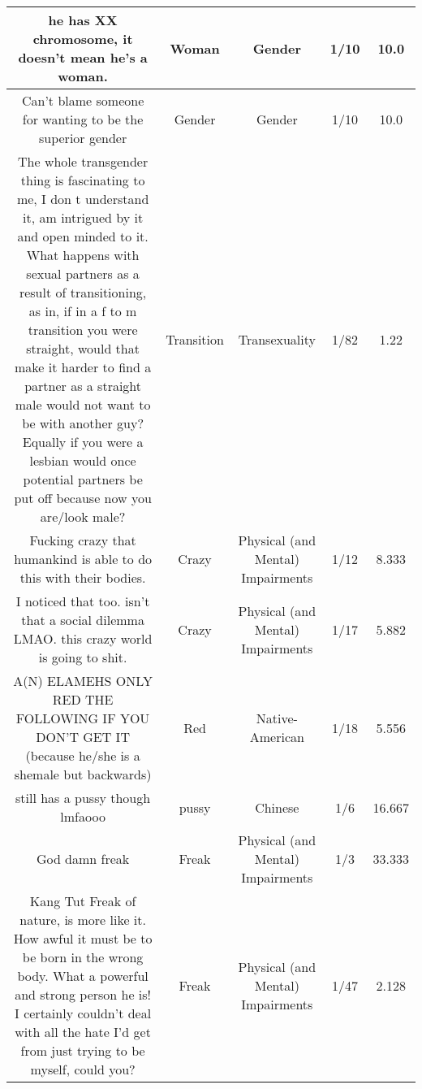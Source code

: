 \documentclass[11pt]{article}
\newlength\mylength
\begin{document}
\begin{center}
\begin{longtable}{|C{.40\mylength}|C{.30\mylength}|C{.15\mylength}|C{.15\mylength}|C{.15\mylength}|}
  he has XX chromosome, it doesn't mean he's a woman.  & Woman & Gender & 1/10 & 10.0 \\  \hline
  Can't blame someone for wanting to be the superior gender  & Gender & Gender & 1/10 & 10.0 \\  \hline
  The whole transgender thing is fascinating to me, I don t understand it, am intrigued by it and open minded to it. What happens with sexual partners as a result of transitioning, as in, if in a f to m transition you were straight, would that make it harder to find a partner as a straight male would not want to be with another guy? Equally if you were a lesbian would once potential partners be put off because now you are/look male?  & Transition & Transexuality & 1/82 & 1.22 \\  \hline
  Fucking crazy that humankind is able to do this with their bodies.  & Crazy & Physical (and Mental) Impairments & 1/12 & 8.333 \\  \hline
  I noticed that too. isn't that a social dilemma LMAO. this crazy world is going to shit.  & Crazy & Physical (and Mental) Impairments & 1/17 & 5.882 \\  \hline
  A(N) ELAMEHS   ONLY RED THE FOLLOWING IF YOU DON'T GET IT  (because he/she is a shemale but backwards)  & Red & Native-American & 1/18 & 5.556 \\  \hline
  still has a pussy though lmfaooo  & pussy & Chinese & 1/6 & 16.667 \\  \hline
  God damn freak  & Freak & Physical (and Mental) Impairments & 1/3 & 33.333 \\  \hline
  Kang Tut  Freak of nature,  is more like it. How awful it must be to be born in the wrong body. What a powerful and strong person he is! I certainly couldn't deal with all the hate I'd get from just trying to be myself, could you?  & Freak & Physical (and Mental) Impairments & 1/47 & 2.128 \\  \hline

\end{longtable}
\end{center}
\end{document}
